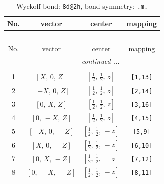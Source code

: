\documentclass[fleqn,8pt]{jsarticle}
\begin{document}
\begin{longtable}{cccc}
\caption{Wyckoff bond: {\tt 8d@2h}, bond symmetry: {\tt .m.}}
 \\
 \hline \hline
No. & vector & center & mapping \\ \hline \endfirsthead

\multicolumn{3}{l}{\tablename\ \thetable{}} \\
 \hline \hline
No. & vector & center & mapping \\ \hline \endhead

 \hline \hline
\multicolumn{3}{r}{\footnotesize\it continued ...} \\ \endfoot

 \hline \hline
\multicolumn{3}{r}{} \\ \endlastfoot

1 & $\left[ X,\, 0,\, Z \right]$ & $\left[ \frac{1}{2},\, \frac{1}{2},\, z \right]$ & {\tt [1,13]} \\ \hline
2 & $\left[ - X,\, 0,\, Z \right]$ & $\left[ \frac{1}{2},\, \frac{1}{2},\, z \right]$ & {\tt [2,14]} \\ \hline
3 & $\left[ 0,\, X,\, Z \right]$ & $\left[ \frac{1}{2},\, \frac{1}{2},\, z \right]$ & {\tt [3,16]} \\ \hline
4 & $\left[ 0,\, - X,\, Z \right]$ & $\left[ \frac{1}{2},\, \frac{1}{2},\, z \right]$ & {\tt [4,15]} \\ \hline
5 & $\left[ - X,\, 0,\, - Z \right]$ & $\left[ \frac{1}{2},\, \frac{1}{2},\, - z \right]$ & {\tt [5,9]} \\ \hline
6 & $\left[ X,\, 0,\, - Z \right]$ & $\left[ \frac{1}{2},\, \frac{1}{2},\, - z \right]$ & {\tt [6,10]} \\ \hline
7 & $\left[ 0,\, X,\, - Z \right]$ & $\left[ \frac{1}{2},\, \frac{1}{2},\, - z \right]$ & {\tt [7,12]} \\ \hline
8 & $\left[ 0,\, - X,\, - Z \right]$ & $\left[ \frac{1}{2},\, \frac{1}{2},\, - z \right]$ & {\tt [8,11]} \\
\end{longtable}
\renewcommand{\arraystretch}{1.2}
\end{document}

